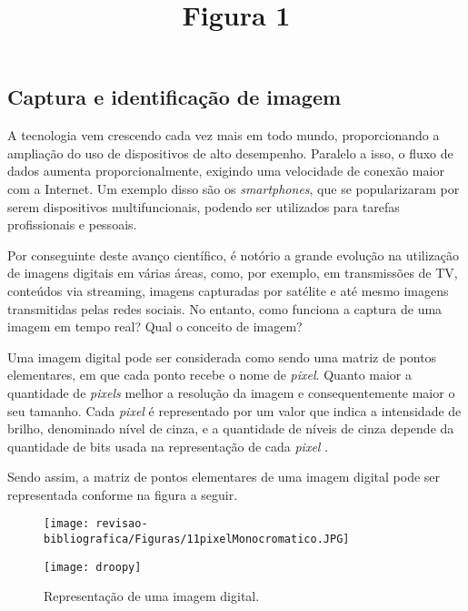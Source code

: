 \subsection{\textbf{Captura e identificação de imagem}}

A tecnologia vem crescendo cada vez mais em todo mundo, proporcionando a ampliação do uso de dispositivos de alto desempenho. Paralelo a isso, o fluxo de dados aumenta proporcionalmente, exigindo uma velocidade de conexão maior com a Internet. Um exemplo disso são os \textit{smartphones}, que se popularizaram por serem dispositivos multifuncionais, podendo ser utilizados para tarefas profissionais e pessoais. 

Por conseguinte deste avanço científico, é notório a grande evolução na utilização de imagens digitais em várias áreas, como, por exemplo, em transmissões de TV, conteúdos via streaming, imagens capturadas por satélite e até mesmo imagens transmitidas pelas redes sociais. No entanto, como funciona a captura de uma imagem em tempo real? Qual o conceito de imagem?

Uma imagem digital pode ser considerada como sendo uma matriz de pontos elementares, em que cada ponto recebe o nome de \textit{pixel}. Quanto maior a quantidade de \textit{pixels} melhor a resolução da imagem e consequentemente maior o seu tamanho. Cada \textit{pixel} é representado por um valor que indica a intensidade de brilho, denominado nível de cinza, e a quantidade de níveis de cinza depende da quantidade de bits usada na representação de cada \textit{pixel} \cite{SOUZA2007}.

Sendo assim, a matriz de pontos elementares de uma imagem digital pode ser representada conforme na figura a seguir.


\title{Figura 1} 
\date{} %
\maketitle
\begin{figure}[h]
\caption{ {\footnotesize Representação de uma imagem digital.}}
 
\centering %
\texttt{[image: revisao-bibliografica/Figuras/11pixelMonocromatico.JPG]} %
\label{figura:figura1}

\centering {}
{
\texttt{[image: droopy]}
\label{figura:figura1}
}
\end{figure}

